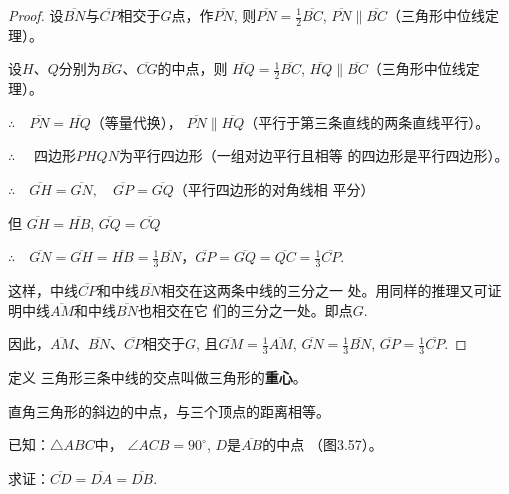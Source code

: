\begin{proof}
设$\overline{BN}$与$\overline{CP}$相交于$G$点，作$\overline{PN}$, 则$\overline{PN}=\frac{1}{2}\overline{BC}$, 
$\overline{PN}\parallel \overline{BC}$（三角形中位线定理）。

设$H$、$Q$分别为$\overline{BG}$、$\overline{CG}$的中点，则
$\overline{HQ}=\frac{1}{2}\overline{BC}$, $\overline{HQ}\parallel\overline{BC}$（三角形中位线定理）。

$\therefore\quad \overline{PN}=\overline{HQ}$（等量代换），
$\overline{PN}\parallel \overline{HQ}$（平行于第三条直线的两条直线平行）。

$\therefore\quad$ 四边形$PHQN$为平行四边形（一组对边平行且相等
的四边形是平行四边形）。

$\therefore\quad \overline{GH}=\overline{GN},\quad \overline{GP}=\overline{GQ}$（平行四边形的对角线相
平分）

但 $\overline{GH}=\overline{HB}$, $\overline{GQ}=\overline{CQ}$

$\therefore\quad \overline{GN}=\overline{GH}=\overline{HB}=\frac{1}{3}\overline{BN}$，$\overline{GP}=\overline{GQ}=\overline{QC}=\frac{1}{3}\overline{CP}$.

这样，中线$\overline{CP}$和中线$\overline{BN}$相交在这两条中线的三分之一
处。用同样的推理又可证明中线$\overline{AM}$和中线$\overline{BN}$也相交在它
们的三分之一处。即点$G$. 

因此，$\overline{AM}$、$\overline{BN}$、$\overline{CP}$相交于$G$, 且$\overline{GM}=\frac{1}{3}\overline{AM}$, $\overline{GN}=\frac{1}{3}\overline{BN}$, $\overline{GP}=\frac{1}{3}\overline{CP}$.
\end{proof}

\begin{blk}
    {定义} 三角形三条中线的交点叫做三角形的\textbf{重心}。
\end{blk}

\begin{example}
    直角三角形的斜边的中点，与三个顶点的距离相等。
\end{example}
    
已知：$\triangle ABC$中，
$\angle ACB=90^{\circ}$, 
$D$是$\overline{AB}$的中点
（图3.57）。

求证：$\overline{CD}=\overline{DA}=\overline{DB}$.

